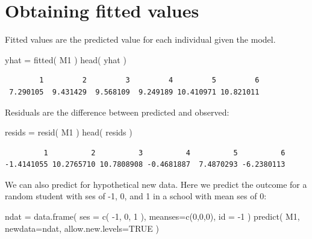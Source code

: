 \documentclass[
  letterpaper,
  DIV=11,
  numbers=noendperiod]{scrreprt}
\newenvironment{Shaded}{}{}
\newcommand{\AttributeTok}[1]{\textcolor[rgb]{0.49,0.56,0.16}{#1}}
\newcommand{\ConstantTok}[1]{\textcolor[rgb]{0.53,0.00,0.00}{#1}}
\newcommand{\DecValTok}[1]{\textcolor[rgb]{0.25,0.63,0.44}{#1}}
\newcommand{\FunctionTok}[1]{\textcolor[rgb]{0.02,0.16,0.49}{#1}}
\newcommand{\NormalTok}[1]{#1}
\newcommand{\OtherTok}[1]{\textcolor[rgb]{0.00,0.44,0.13}{#1}}
\newcommand{\SpecialCharTok}[1]{\textcolor[rgb]{0.25,0.44,0.63}{#1}}
\begin{document}
\section{Obtaining fitted values}\label{obtaining-fitted-values}

Fitted values are the predicted value for each individual given the
model.

\begin{Shaded}
\begin{Highlighting}[]
\NormalTok{yhat }\OtherTok{=} \FunctionTok{fitted}\NormalTok{( M1 )}
\FunctionTok{head}\NormalTok{( yhat )}
\end{Highlighting}
\end{Shaded}

\begin{verbatim}
        1         2         3         4         5         6 
 7.290105  9.431429  9.568109  9.249189 10.410971 10.821011 
\end{verbatim}

Residuals are the difference between predicted and observed:

\begin{Shaded}
\begin{Highlighting}[]
\NormalTok{resids }\OtherTok{=} \FunctionTok{resid}\NormalTok{( M1 )}
\FunctionTok{head}\NormalTok{( resids )}
\end{Highlighting}
\end{Shaded}

\begin{verbatim}
         1          2          3          4          5          6 
-1.4141055 10.2765710 10.7808908 -0.4681887  7.4870293 -6.2380113 
\end{verbatim}

We can also predict for hypothetical new data. Here we predict the
outcome for a random student with ses of -1, 0, and 1 in a school with
mean ses of 0:

\begin{Shaded}
\begin{Highlighting}[]
\NormalTok{ndat }\OtherTok{=} \FunctionTok{data.frame}\NormalTok{( }\AttributeTok{ses =} \FunctionTok{c}\NormalTok{( }\SpecialCharTok{{-}}\DecValTok{1}\NormalTok{, }\DecValTok{0}\NormalTok{, }\DecValTok{1}\NormalTok{ ), }\AttributeTok{meanses=}\FunctionTok{c}\NormalTok{(}\DecValTok{0}\NormalTok{,}\DecValTok{0}\NormalTok{,}\DecValTok{0}\NormalTok{), }\AttributeTok{id =} \SpecialCharTok{{-}}\DecValTok{1}\NormalTok{ )}
\FunctionTok{predict}\NormalTok{( M1, }\AttributeTok{newdata=}\NormalTok{ndat, }\AttributeTok{allow.new.levels=}\ConstantTok{TRUE}\NormalTok{ )}
\end{Highlighting}
\end{Shaded}
\end{document}
